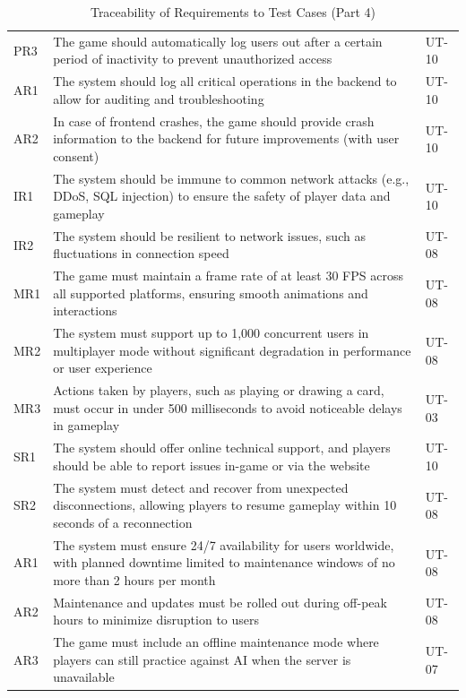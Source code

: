 \documentclass[12pt, titlepage]{article}
\begin{document}
\begin{table}[H]
    \centering
    \begin{tabularx}{\textwidth}{|l|X|l|}
        \hline
        PR3 & The game should automatically log users out after a certain period of inactivity to prevent unauthorized access & UT-10 \\
        AR1 & The system should log all critical operations in the backend to allow for auditing and troubleshooting & UT-10 \\
        AR2 & In case of frontend crashes, the game should provide crash information to the backend for future improvements (with user consent) & UT-10 \\
        IR1 & The system should be immune to common network attacks (e.g., DDoS, SQL injection) to ensure the safety of player data and gameplay & UT-10 \\
        IR2 & The system should be resilient to network issues, such as fluctuations in connection speed & UT-08 \\
        MR1 & The game must maintain a frame rate of at least 30 FPS across all supported platforms, ensuring smooth animations and interactions & UT-08 \\
        MR2 & The system must support up to 1,000 concurrent users in multiplayer mode without significant degradation in performance or user experience & UT-08 \\
        MR3 & Actions taken by players, such as playing or drawing a card, must occur in under 500 milliseconds to avoid noticeable delays in gameplay & UT-03 \\
        SR1 & The system should offer online technical support, and players should be able to report issues in-game or via the website & UT-10 \\
        SR2 & The system must detect and recover from unexpected disconnections, allowing players to resume gameplay within 10 seconds of a reconnection & UT-08 \\
        AR1 & The system must ensure 24/7 availability for users worldwide, with planned downtime limited to maintenance windows of no more than 2 hours per month & UT-08 \\
        AR2 & Maintenance and updates must be rolled out during off-peak hours to minimize disruption to users & UT-08 \\
        AR3 & The game must include an offline maintenance mode where players can still practice against AI when the server is unavailable & UT-07 \\
        \hline
    \end{tabularx}
    \caption{Traceability of Requirements to Test Cases (Part 4)}
    \label{tab:trace_requirements_4}
\end{table}
\end{document}
